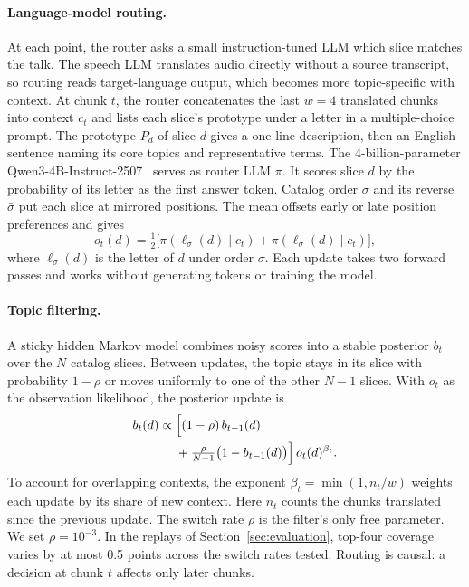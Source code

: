 \paragraph{Language-model routing.}
At each point, the router asks a small instruction-tuned LLM which slice
matches the talk. The speech LLM translates audio directly without a source
transcript, so routing reads target-language output, which becomes more
topic-specific with context. At chunk $t$, the router concatenates the last
$w=4$ translated chunks into context $c_t$ and lists each slice's prototype
under a letter in a multiple-choice prompt. The prototype $P_d$ of slice $d$
gives a one-line description, then an English sentence naming its core topics
and representative terms. The 4-billion-parameter
Qwen3-4B-Instruct-2507~\citep{yang2025qwen3} serves as router LLM $\pi$. It
scores slice $d$ by the probability of its letter as the first answer token.
Catalog order $\sigma$ and its reverse $\bar\sigma$ put each slice at
mirrored positions. The mean offsets early or late position preferences and gives
\begin{equation}
  o_t(d)=\tfrac12\bigl[\pi(\ell_\sigma(d)\mid c_t)
  +\pi(\ell_{\bar\sigma}(d)\mid c_t)\bigr],
\end{equation}
where $\ell_\sigma(d)$ is the letter of $d$ under order $\sigma$. Each update
takes two forward passes and works without generating tokens or training the model.

\paragraph{Topic filtering.}
A sticky hidden Markov model combines noisy scores into a stable posterior $b_t$ over
the $N$ catalog slices. Between updates, the topic stays in its slice with
probability $1-\rho$ or moves uniformly to one of the other $N-1$ slices. With $o_t$
as the observation likelihood, the posterior update is
\begin{equation}
\begin{aligned}
  b_t(d)\propto{}&\Bigl[(1-\rho)\,b_{t-1}(d)\\
  &+\tfrac{\rho}{N-1}\bigl(1-b_{t-1}(d)\bigr)\Bigr]\,o_t(d)^{\beta_t}.
\end{aligned}
\end{equation}
To account for overlapping contexts, the exponent $\beta_t=\min(1,n_t/w)$ weights
each update by its share of new context. Here $n_t$ counts the chunks translated
since the previous update. The switch rate $\rho$ is
the filter's only free parameter. We set $\rho=10^{-3}$. In the replays of Section~\ref{sec:evaluation}, top-four coverage varies by at
most 0.5 points across the switch rates tested. Routing is causal: a decision at chunk $t$ affects only later chunks.

